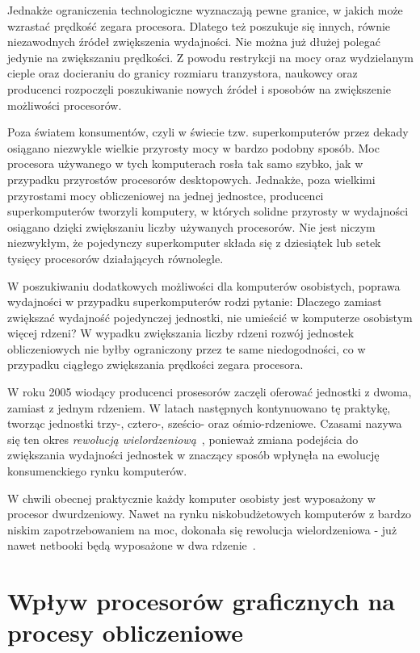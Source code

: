 Jednakże ograniczenia technologiczne wyznaczają pewne granice, w jakich może wzrastać prędkość zegara procesora. Dlatego też poszukuje się innych, równie niezawodnych źródeł zwiększenia wydajności. Nie można już dłużej polegać jedynie na zwiększaniu prędkości. Z powodu restrykcji na mocy oraz wydzielanym cieple oraz docieraniu do granicy rozmiaru tranzystora, naukowcy oraz producenci rozpoczęli poszukiwanie nowych źródeł i sposobów na zwiększenie możliwości procesorów.

Poza światem konsumentów, czyli w świecie tzw. superkomputerów przez dekady osiągano niezwykle wielkie przyrosty mocy w bardzo podobny sposób. Moc procesora używanego w tych komputerach rosła tak samo szybko, jak w przypadku przyrostów procesorów desktopowych. Jednakże, poza wielkimi przyrostami mocy obliczeniowej na jednej jednostce, producenci superkomputerów tworzyli komputery, w których solidne przyrosty w wydajności osiągano dzięki zwiększaniu liczby używanych procesorów. Nie jest niczym niezwykłym, że pojedynczy superkomputer składa się z dziesiątek lub setek tysięcy procesorów działających równolegle.

W poszukiwaniu dodatkowych możliwości dla komputerów osobistych, poprawa wydajności w przypadku superkomputerów rodzi pytanie: Dlaczego zamiast zwiększać wydajność pojedynczej jednostki, nie umieścić w komputerze osobistym więcej rdzeni? W wypadku zwiększania liczby rdzeni rozwój jednostek obliczeniowych nie byłby ograniczony przez te same niedogodności, co w przypadku ciągłego zwiększania prędkości zegara procesora.

W roku 2005 wiodący producenci prosesorów zaczęli oferować jednostki z dwoma, zamiast z jednym rdzeniem. W latach następnych kontynuowano tę praktykę, tworząc jednostki trzy-, cztero-, sześcio- oraz ośmio-rdzeniowe. Czasami nazywa się ten okres \emph{rewolucją wielordzeniową}~\cite{Cuda:Example}, ponieważ zmiana podejścia do zwiększania wydajności jednostek w znaczący sposób wpłynęła na ewolucję konsumenckiego rynku komputerów.

W chwili obecnej praktycznie każdy komputer osobisty jest wyposażony w procesor dwurdzeniowy. Nawet na rynku niskobudżetowych komputerów z bardzo niskim zapotrzebowaniem na moc, dokonała się rewolucja wielordzeniowa - już nawet netbooki będą wyposażone w dwa rdzenie~\cite{intel:netbook}. 

\section{Wpływ procesorów graficznych na procesy obliczeniowe}

